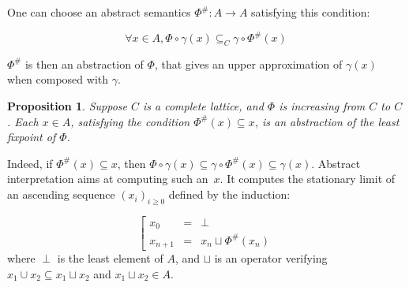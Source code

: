 \documentclass[a4paper,english,titlepage,11pt]{report}
\newtheorem{proposition}[theorem]{Proposition}
\def\lfp{\textnormal{\it lfp}}
\begin{document}
One can choose an abstract semantics $\Phi^\#: A \rightarrow A$ satisfying this
condition:

$$\forall x \in A, \Phi \circ \gamma (x) \subseteq_C \gamma \circ \Phi^\#(x)$$

$\Phi^\#$ is then an abstraction of $\Phi$, that gives an upper
approximation of $\gamma(x)$ when composed with $\gamma$. 



\begin{proposition}
Suppose $C$ is a complete lattice, and $\Phi$ is increasing from $C$ to $C$.
Each $x \in A$, satisfying the condition $\Phi^\#(x) \subseteq x$, is an abstraction of
the least fixpoint of $\Phi$.
\end{proposition}

Indeed, if $\Phi^\#(x) \subseteq x$, then $\Phi \circ \gamma (x) 
\subseteq \gamma \circ \Phi^\#(x) \subseteq \gamma(x)$.
Abstract interpretation aims at computing
such an~$x$. It computes the stationary limit of an ascending sequence
$(x_i)_{i \geq 0}$ defined by the induction:

$$\left[
\begin{array}{lll}
x_0 &=& \perp \\
x_{n+1} &=& x_n \sqcup \Phi^\#(x_n)
\end{array}
\right.
$$
where $\perp$ is the least element of $A$, and $\sqcup$ is an operator verifying
$x_1 \cup x_2 \subseteq x_1 \sqcup x_2$ and $x_1 \sqcup x_2 \in A$.
%
%
%
%
\end{document}

